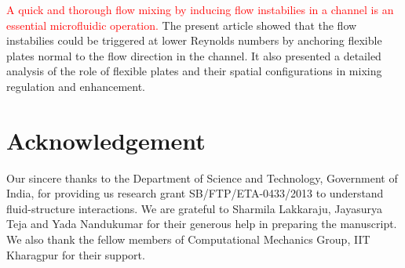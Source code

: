 \documentclass[aps,pre,twocolumn,aps,longbibliography]{revtex4-1}
\begin{document}
	\textcolor{red}{A quick and thorough flow mixing by inducing flow instabilies in a channel is an essential microfluidic operation.} The present article showed that the flow instabilies could be triggered at lower Reynolds numbers by anchoring flexible plates normal to the flow direction in the channel. It also presented a detailed analysis of the role of flexible plates and their spatial configurations in mixing regulation and enhancement.
	
	\section{Acknowledgement}
	Our sincere thanks to the Department of Science and Technology, Government of India, for providing us research grant SB/FTP/ETA-0433/2013 to understand fluid-structure interactions. We are grateful to Sharmila Lakkaraju, Jayasurya Teja and Yada Nandukumar for their generous help in preparing the manuscript. We also thank the fellow members of Computational Mechanics Group, IIT Kharagpur for their support.
	
	
	
	
	
\end{document}
